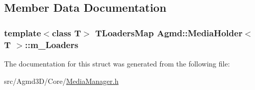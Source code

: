 \subsection{Member Data Documentation}
\hypertarget{struct_agmd_1_1_media_holder_a4df2d17cb2fc5e1144b011e3e251836f}{
\subsubsection[{m\+\_\+\+Loaders}]{\setlength{\rightskip}{0pt plus 5cm}template$<$class T$>$ {\bf T\+Loaders\+Map} {\bf Agmd\+::\+Media\+Holder}$<$ T $>$\+::m\+\_\+\+Loaders}}\label{struct_agmd_1_1_media_holder_a4df2d17cb2fc5e1144b011e3e251836f}


The documentation for this struct was generated from the following file\+:\begin{DoxyCompactItemize}
\item 
src/\+Agmd3\+D/\+Core/\hyperlink{_media_manager_8h}{Media\+Manager.\+h}\end{DoxyCompactItemize}
